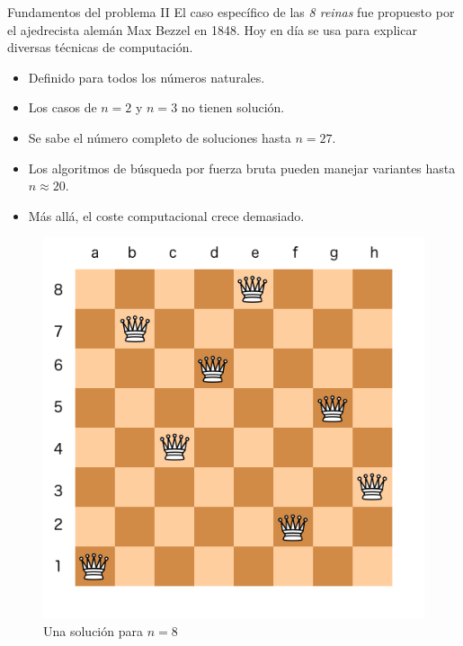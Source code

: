 \documentclass[usenames,dvipsnames,aspectratio=169]{beamer}
\begin{document}
\begin{frame}{Fundamentos del problema II}
El caso específico de las \textit{8 reinas} fue propuesto por el ajedrecista alemán Max Bezzel en 1848. Hoy en día se usa para explicar diversas técnicas de computación.
	\begin{minipage}{.6\linewidth}
		\begin{itemize}
			\item Definido para todos los números naturales.
			\item Los casos de $n=2$ y $n=3$ no tienen solución.
			\item Se sabe el número completo de soluciones hasta $n=27$.
			\item Los algoritmos de búsqueda por fuerza bruta pueden manejar variantes hasta $n\approx20$.
			\item Más allá, el coste computacional crece demasiado.
		\end{itemize}
	\end{minipage}
	\begin{minipage}{.35\linewidth}
		\begin{figure}
		\includegraphics[width=.9\linewidth]{graphics/8queens.png}
		\caption{Una solución para $n=8$}
		\end{figure}
	\end{minipage}
\end{frame}
\end{document}
